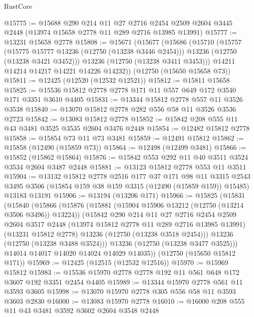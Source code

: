 \begin{lexlean}{RustCore}
\begin{coremodule}
@15775 := @15688
    @290
    @214
    @11
    @27
    @2716
    @2454
    @2509
    @2604
    @3445
    @2448
    (@13974 @15658 @2778 @11 @289 @2716 @13985 @13991)
@15777 := @13231 @15658 @2778
@15808 := @15671
    (@15677
      (@15686
        (@15710
          (@15757
            (@15775 @15777 @13236 (@12750 (@13238 @3446 @2454)))
            @13236
            (@12750 (@13238 @3421 @3452)))
          @13236
          (@12750 (@13238 @3411 @3453)))
        @14211
        @14214
        @14217
        @14221
        @14226
        @14232))
    (@12750 (@15650 @15658 @73))
@15811 := @12425 (@12520 (@12532 @12521))
@15812 := @15811 @15658
@15825 := @15536 @15812 @2778 @2778 @171 @11 @557 @649 @172 @3540 @171 @3351 @3610 @4405
@15831 := @13344 @15812 @2778 @557 @11 @3526 @3538
@15840 := @13070 @15812 @2778 @282 @556 @58 @11 @3526 @3536 @2723
@15842 := @13083 @15812 @2778
@15852 := @15842 @208 @555 @11 @43 @3481 @3525 @3535 @2604 @3476 @2448
@15854 := @12482 @15812 @2778
@15858 := @15854 @73 @11 @73 @3481
@15859 := @12491 @15812
@15862 := @15858 (@12490 (@15859 @73))
@15864 := @12498 (@12499 @3481)
@15866 := @15852 (@15862 @15864)
@15876 := @15842 @553 @292 @11 @40 @3511 @3524 @3534 @2604 @3487 @2448
@15881 := @13123 @15812 @2778 @553 @11 @3511
@15904 := @13132
    @15812
    @2778
    @2516
    @177
    @37
    @171
    @98
    @11
    @3315
    @2543
    @3495
    @3506
    (@15854 @159 @38 @159 @3315 (@12490 (@15859 @159)) @15485)
    @13183
    @13191
@15906 := @13194 (@13206 @171)
@15966 := @15825
    (@15831
      (@15840
        (@15866
          (@15876
            (@15881 (@15904 @15906 @13212 (@12750 (@13214 @3506 @3496)) @13224))
            (@15842
              @290
              @214
              @11
              @27
              @2716
              @2454
              @2509
              @2604
              @3517
              @2448
              (@13974 @15812 @2778 @11 @289 @2716 @13985 @13991)
              (@13231 @15812 @2778)
              @13236
              (@12750 (@13238 @3518 @2454)))
            @13236
            (@12750 (@13238 @3488 @3524)))
          @13236
          (@12750 (@13238 @3477 @3525)))
        @14014
        @14017
        @14020
        @14024
        @14029
        @14035))
    (@12750 (@15650 @15812 @171))
@15969 := @12425 (@12515 (@12532 @12516))
@15970 := @15969 @15812
@15983 := @15536 @15970 @2778 @2778 @192 @11 @561 @648 @172 @3607 @192 @3351 @2454 @4405
@15989 := @13344 @15970 @2778 @561 @11 @3593 @3605
@15998 := @13070 @15970 @2778 @305 @556 @58 @11 @3593 @3603 @2830
@16000 := @13083 @15970 @2778
@16010 := @16000 @208 @555 @11 @43 @3481 @3592 @3602 @2604 @3548 @2448

\end{coremodule}
\end{lexlean}
